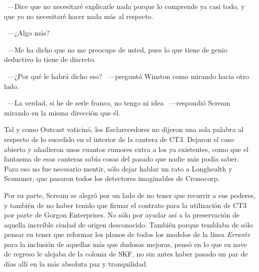 ~---Dice que no necesitaré explicarle nada porque lo comprende ya casi todo, y que yo no necesitaré hacer nada más al respecto.

~---¿Algo más?

~---Me ha dicho que no me preocupe de usted, pues lo que tiene de genio deductivo lo tiene de discreto.

~---¿Por qué le habrá dicho eso? ~---preguntó Winston como mirando hacia otro lado.

~---La verdad, si he de serle franco, no tengo ni idea ~---respondió Scream mirando en la misma dirección que él.

\bigskip\noindent
Tal y como Outcast vaticinó, los Esclarecedores no dijeron una sola palabra al respecto de lo sucedido en el interior de la cantera de CT3. Dejaron el caso abierto y añadieron unos cuantos rumores extra a los ya existentes, como que el fantasma de esas canteras sabía cosas del pasado que nadie más podía saber. Para eso no fue necesario mentir, sólo dejar hablar un rato a Longhealth y Scummer, que pasaron todos los detectores imaginables de Cronocorp.

Por su parte, Scream se alegró por un lado de no tener que recurrir a sus poderes, y también de no haber tenido que firmar el contrato para la utilización de CT3 por parte de Gorgon Enterprises. No sólo por ayudar así a la preservación de aquella increíble ciudad de origen desconocido. También porque temblaba de sólo pensar en tener que reformar los planos de todos los modelos de la línea \emph{Errante} para la inclusión de aquellas más que dudosas mejoras, pensó en lo que su nave de regreso le alejaba de la colonia de SKF, no sin antes haber pasado un par de días allí en la más absoluta paz y tranquilidad.

\endinput
